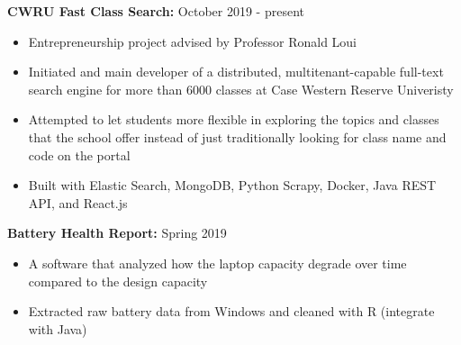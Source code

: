 \documentclass[a4paper,11pt]{article}
\begin{document}
\begin{flushleft}
	
	\textbf{CWRU Fast Class Search:} October 2019 - present
	\vspace{-\topsep}
	\begin{itemize}
		\setlength{\parskip}{2pt}
		\setlength{\itemsep}{0pt plus 1pt}
		\item Entrepreneurship project advised by Professor Ronald Loui
		\item Initiated and main developer of a distributed, multitenant-capable full-text search engine for more than 6000 classes at Case Western Reserve Univeristy
		\item Attempted to let students more flexible in exploring the topics and classes that the school offer instead of just traditionally looking for class name and code on the portal
		\item Built with Elastic Search, MongoDB, Python Scrapy, Docker, Java REST API, and React.js
	\end{itemize}
	
	\textbf{Battery Health Report: } Spring 2019
	\vspace{-\topsep}
	\begin{itemize}
		\setlength{\parskip}{2pt}
		\setlength{\itemsep}{0pt plus 1pt}
		\item A software that analyzed how the laptop capacity degrade over time compared to the design capacity 
		\item Extracted raw battery data from Windows and cleaned with R (integrate with Java)
	\end{itemize}
	
\centering{\noindent\makebox{\rule{8cm}{1.5pt}}}
\end{flushleft}
\end{document}

